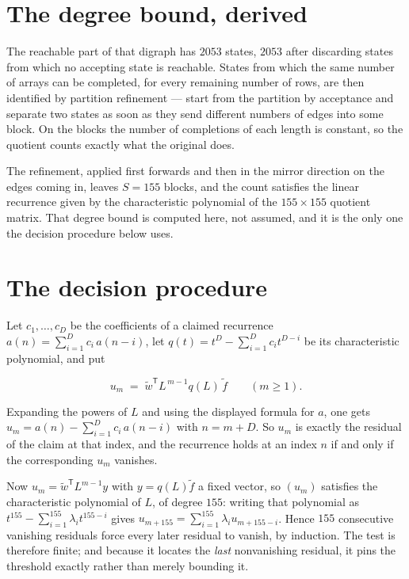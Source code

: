 \documentclass[11pt]{article}
\theoremstyle{definition}
\begin{document}
\section{The degree bound, derived}

The reachable part of that digraph has $2053$ states, $2053$ after discarding states from which no accepting state is reachable. States from which the same number of arrays can be completed, for every remaining number of rows, are then identified by partition refinement --- start from the partition by acceptance and separate two states as soon as they send different numbers of edges into some block. On the blocks the number of completions of each length is constant, so the quotient counts exactly what the original does.

The refinement, applied first forwards and then in the mirror direction on the edges coming in, leaves $S = 155$ blocks, and the count satisfies the linear recurrence given by the characteristic polynomial of the $155 \times 155$ quotient matrix. That degree bound is computed here, not assumed, and it is the only one the decision procedure below uses.

\section{The decision procedure}

Let $c_1,\dots,c_D$ be the coefficients of a claimed recurrence $a(n) = \sum_{i=1}^{D} c_i\,a(n-i)$, let $q(t) = t^{D} - \sum_{i=1}^{D} c_i t^{D-i}$ be its characteristic polynomial, and put

\[u_m \;=\; \tilde w^{\mathsf T} L^{\,m-1} q(L)\,\tilde f \qquad (m \ge 1).\]

Expanding the powers of $L$ and using the displayed formula for $a$, one gets $u_m = a(n) - \sum_{i=1}^{D} c_i\,a(n-i)$ with $n = m + D$. So $u_m$ is exactly the residual of the claim at that index, and the recurrence holds at an index $n$ if and only if the corresponding $u_m$ vanishes.

Now $u_m = \tilde w^{\mathsf T} L^{m-1} y$ with $y = q(L)\tilde f$ a fixed vector, so $(u_m)$ satisfies the characteristic polynomial of $L$, of degree $155$: writing that polynomial as $t^{155} - \sum_{i=1}^{155} \lambda_i t^{155-i}$ gives $u_{m+155} = \sum_{i=1}^{155} \lambda_i u_{m+155-i}$. Hence $155$ consecutive vanishing residuals force every later residual to vanish, by induction. The test is therefore finite; and because it locates the {\itshape last} nonvanishing residual, it pins the threshold exactly rather than merely bounding it.
\end{document}
